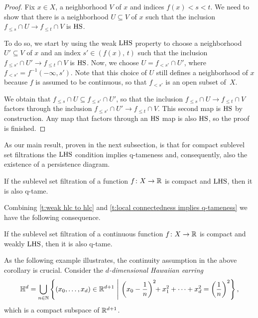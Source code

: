\begin{proof}
	Fix $x \in X$, a neighborhood $V$ of $x$ and indices $f(x) < s < t$.
	We need to show that there is a neighborhood $U \subseteq V$ of $x$ such that the inclusion $f_{\leq s} \cap U \to f_{\leq t} \cap V$ is $\mathrm{HS}$.

	To do so, we start by using the weak $\mathrm{LHS}$ property to choose a neighborhood $U' \subseteq V$ of $x$ and an index $s' \in (f(x),\, t)$ such that the inclusion $f_{\leq s'} \cap U' \to f_{\leq t} \cap V$ is $\mathrm{HS}$.
	Now, we choose $U = f_{< s'} \cap U'$, where $f_{< s'} = f^{-1} (-\infty, s')$.
	Note that this choice of $U$ still defines a neighborhood of $x$ because $f$ is assumed to be continuous, so that $f_{< s'}$ is an open subset of~$X$.

	We obtain that $f_{\leq s} \cap U \subseteq f_{\leq s'} \cap U'$, so that the inclusion $f_{\leq s} \cap U \to f_{\leq t} \cap V$ factors through the inclusion $f_{\leq s'} \cap U' \to f_{\leq t} \cap V$.
	This second map is $\mathrm{HS}$ by construction.
	Any map that factors through an $\mathrm{HS}$ map is also $\mathrm{HS}$, so the proof is finished.
\end{proof}

As our main result, proven in the next subsection, is that for compact sublevel set filtrations the $\mathrm{LHS}$ condition implies \mbox{q-tameness} and, consequently, also the existence of a persistence diagram.

\begin{thm} \label{t:local connectedness implies q-tameness}
	If the sublevel set filtration of a function $f \colon X \to \mathbb{R}$ is compact and	$\mathrm{LHS}$, then it is also q-tame.
\end{thm}

Combining \cref{t:weak hlc to hlc} and \cref{t:local connectedness implies q-tameness} we have the following consequence.

\begin{cor} \label{c:q-tameness for continuous functions}
	If the sublevel set filtration of a continuous function $f \colon X \to \mathbb{R}$ is compact and weakly $\mathrm{LHS}$, then it is also q-tame.
\end{cor}

As the following example illustrates, the continuity assumption in the above corollary is crucial.
Consider the \emph{$d$-dimensional Hawaiian earring}
\begin{equation*}
\mathbb{H}^d = \bigcup_{n \in \mathbb{N}} \left\{ (x_0, \dots, x_d) \in \mathbb{R}^{d+1} \ \middle | \ \left( x_0 - \frac{1}{n} \right)^2 \!\! + x_1^2 + \dots + x_d^2 = \left( \frac{1}{n} \right)^2 \right\},
\end{equation*}
which is a compact subspace of $\mathbb{R}^{d+1}$.

